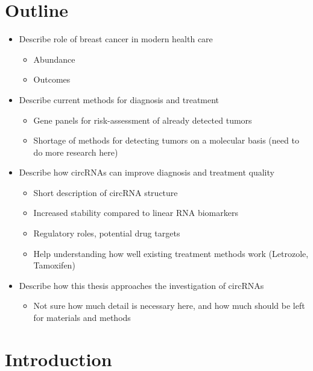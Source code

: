 \section{Outline}

\begin{itemize}
    \item Describe role of breast cancer in modern health care
    \begin{itemize}
        \item Abundance
        \item Outcomes
    \end{itemize}
    \item Describe current methods for diagnosis and treatment
    \begin{itemize}
        \item Gene panels for risk-assessment of already detected tumors
        \item Shortage of methods for detecting tumors on a molecular basis (need to do more research here)
    \end{itemize}
    \item Describe how circRNAs can improve diagnosis and treatment quality
    \begin{itemize}
        \item Short description of circRNA structure
        \item Increased stability compared to linear RNA biomarkers
        \item Regulatory roles, potential drug targets
        \item Help understanding how well existing treatment methods work (Letrozole, Tamoxifen)
    \end{itemize}
    \item Describe how this thesis approaches the investigation of circRNAs
    \begin{itemize}
        \item Not sure how much detail is necessary here, and how much should be left for materials and methods
    \end{itemize}
\end{itemize}

\section{Introduction}

\lipsum[1-10]